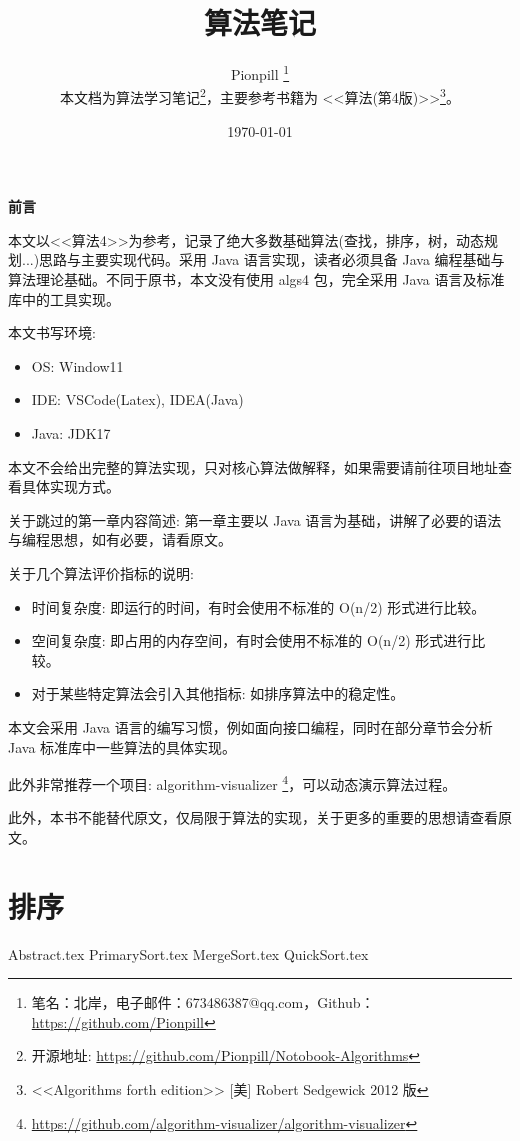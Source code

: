 \documentclass{PionpillNote-book}
\title{算法笔记}
\author{
    Pionpill \footnote{笔名：北岸，电子邮件：673486387@qq.com，Github：\url{https://github.com/Pionpill}} \\
    本文档为算法学习笔记\footnote{开源地址: \url{https://github.com/Pionpill/Notobook-Algorithms}}，主要参考书籍为 <<算法(第4版)>>\footnote{<<Algorithms forth edition>> [美] Robert Sedgewick 2012 版}。
}
\date{\today}
\begin{document}
\pagestyle{plain}
\maketitle

\noindent\textbf{前言}

本文以<<算法4>>为参考，记录了绝大多数基础算法(查找，排序，树，动态规划...)思路与主要实现代码。采用 Java 语言实现，读者必须具备 Java 编程基础与算法理论基础。不同于原书，本文没有使用 algs4 包，完全采用 Java 语言及标准库中的工具实现。

本文书写环境:
\begin{itemize}
    \item OS: Window11
    \item IDE: VSCode(Latex), IDEA(Java)
    \item Java: JDK17
\end{itemize}

本文不会给出完整的算法实现，只对核心算法做解释，如果需要请前往项目地址查看具体实现方式。

关于跳过的第一章内容简述: 第一章主要以 Java 语言为基础，讲解了必要的语法与编程思想，如有必要，请看原文。

关于几个算法评价指标的说明:

\begin{itemize}
    \item 时间复杂度: 即运行的时间，有时会使用不标准的 O(n/2) 形式进行比较。
    \item 空间复杂度: 即占用的内存空间，有时会使用不标准的 O(n/2) 形式进行比较。
    \item 对于某些特定算法会引入其他指标: 如排序算法中的稳定性。
\end{itemize}

本文会采用 Java 语言的编写习惯，例如面向接口编程，同时在部分章节会分析 Java 标准库中一些算法的具体实现。

此外非常推荐一个项目: algorithm-visualizer
\footnote{\url{https://github.com/algorithm-visualizer/algorithm-visualizer}}，可以动态演示算法过程。

此外，本书不能替代原文，仅局限于算法的实现，关于更多的重要的思想请查看原文。

\newpage

\tableofcontents

\newpage

\setcounter{page}{1} 
\pagestyle{fancy}

\chapter{排序}
{Abstract.tex}
{PrimarySort.tex}
{MergeSort.tex}
{QuickSort.tex}
\end{document}
